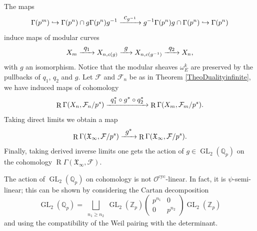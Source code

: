 \documentclass[JEP,XML,SOM,Unicode,published]{cedram}
\newcommand\hto{\mathrel{\lhook\joinrel\to}}
\newcommand\To[1]{\mathchoice{\xrightarrow{\textstyle\kern4pt#1\kern3pt}}{\stackrel{#1}{\to}}{}{}}
\newcommand{\cyc}{\mathrm{cyc}}
\numberwithin{equation}{section}
\theoremstyle{definition}
\newcommand{\bb}[1]{\mathbb{#1}}
\newcommand{\n}[1]{\mathcal{#1}}
\newcommand{\f}[1]{\mathfrak{#1}}
\DeclareMathOperator{\GL}{GL}
\DeclareMathOperator{\R}{R}
\begin{document}
The maps
\[
\Gamma(p^m)\hto \Gamma(p^n)\cap g\Gamma(p^n)g^{-1}\To{c_{g^{-1}}} g^{-1}\Gamma(p^n)g \cap \Gamma(p^n)\hto \Gamma(p^n)
\]
induce maps of modular curves
\[
X_m \To{q_1} X_{n,c(g)} \To{g} X_{n,c(g^{-1})} \To{q_2} X_{n},
\]
with $g$ an isomorphism. Notice that the modular sheaves $\omega^k_E$ are preserved by the pullbacks of $q_1$, $q_2$ and $g$. Let $\n{F}$ and $\n{F}_n$ be as in Theorem \ref{TheoDualityinfinite}, we have induced maps of cohomology
\[
\R\Gamma(X_n, \n{F}_n/p^s) \To{ q_1^* \circ g^*\circ q_2^*} \R\Gamma(X_{m}, \n{F}_m/p^s).
\]
Taking direct limits we obtain a map
\[
\R\Gamma(\f{X}_{\infty}, \n{F}/p^s)\To{g^*} \R\Gamma(\f{X}_{\infty}, \n{F}/p^s).
\]
Finally, taking derived inverse limits one gets the action of $g\in \GL_2(\bb{Q}_p)$ on the cohomology $\R\Gamma(\f{X}_{\infty}, \n{F})$.

The action of $\GL_2(\bb{Q}_p)$ on cohomology is not $\n{O}^{\cyc}$-linear. In fact, it is $\psi$-semi-linear; this can be shown by considering the Cartan decomposition
\[\GL_2(\bb{Q}_p)= \bigsqcup_{\substack{n_1 \geq n_2 }} \GL_2(\bb{Z}_p) \left(\begin{matrix} p^{n_1} & 0 \\ 0 & p^{n_2} \end{matrix} \right) \GL_2(\bb{Z}_p)
\]
and using the compatibility of the Weil pairing with the determinant.
\end{document}
